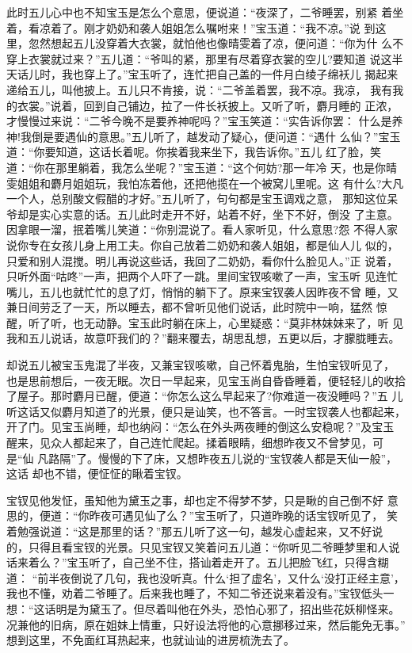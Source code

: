此时五儿心中也不知宝玉是怎么个意思，便说道：“夜深了，二爷睡罢，别紧
着坐着，看凉着了。刚才奶奶和袭人姐姐怎么嘱咐来！”宝玉道：“我不凉。”说
到这里，忽然想起五儿没穿着大衣裳，就怕他也像晴雯着了凉，便问道：“你为什
么不穿上衣裳就过来？”五儿道：“爷叫的紧，那里有尽着穿衣裳的空儿?要知道
说这半天话儿时，我也穿上了。”宝玉听了，连忙把自己盖的一件月白绫子绵袄儿
揭起来递给五儿，叫他披上。五儿只不肯接，说：“二爷盖着罢，我不凉。我凉，
我有我的衣裳。”说着，回到自己铺边，拉了一件长袄披上。又听了听，麝月睡的
正浓，才慢慢过来说：“二爷今晚不是要养神呢吗？”宝玉笑道：“实告诉你罢：
什么是养神!我倒是要遇仙的意思。”五儿听了，越发动了疑心，便问道：“遇什
么仙？”宝玉道：“你要知道，这话长着呢。你挨着我来坐下，我告诉你。”五儿
红了脸，笑道：“你在那里躺着，我怎么坐呢？”宝玉道：“这个何妨?那一年冷
天，也是你晴雯姐姐和麝月姐姐玩，我怕冻着他，还把他揽在一个被窝儿里呢。这
有什么?大凡一个人，总别酸文假醋的才好。”五儿听了，句句都是宝玉调戏之意，
那知这位呆爷却是实心实意的话。五儿此时走开不好，站着不好，坐下不好，倒没
了主意。因拿眼一溜，抿着嘴儿笑道：“你别混说了。看人家听见，什么意思?怨
不得人家说你专在女孩儿身上用工夫。你自己放着二奶奶和袭人姐姐，都是仙人儿
似的，只爱和别人混搅。明儿再说这些话，我回了二奶奶，看你什么脸见人。”正
说着，只听外面“咕咚”一声，把两个人吓了一跳。里间宝钗咳嗽了一声，宝玉听
见连忙嘴儿，五儿也就忙忙的息了灯，悄悄的躺下了。原来宝钗袭人因昨夜不曾
睡，又兼日间劳乏了一天，所以睡去，都不曾听见他们说话，此时院中一响，猛然
惊醒，听了听，也无动静。宝玉此时躺在床上，心里疑惑：“莫非林妹妹来了，听
见我和五儿说话，故意吓我们的？”翻来覆去，胡思乱想，五更以后，才朦胧睡去。

却说五儿被宝玉鬼混了半夜，又兼宝钗咳嗽，自己怀着鬼胎，生怕宝钗听见了，
也是思前想后，一夜无眠。次日一早起来，见宝玉尚自昏昏睡着，便轻轻儿的收拾
了屋子。那时麝月已醒，便道：“你怎么这么早起来了?你难道一夜没睡吗？”五
儿听这话又似麝月知道了的光景，便只是讪笑，也不答言。一时宝钗袭人也都起来，
开了门。见宝玉尚睡，却也纳闷：“怎么在外头两夜睡的倒这么安稳呢？”及宝玉
醒来，见众人都起来了，自己连忙爬起。揉着眼睛，细想昨夜又不曾梦见，可是“仙
凡路隔”了。慢慢的下了床，又想昨夜五儿说的“宝钗袭人都是天仙一般”，这话
却也不错，便怔怔的瞅着宝钗。

宝钗见他发怔，虽知他为黛玉之事，却也定不得梦不梦，只是瞅的自己倒不好
意思的，便道：“你昨夜可遇见仙了么？”宝玉听了，只道昨晚的话宝钗听见了，
笑着勉强说道：“这是那里的话？”那五儿听了这一句，越发心虚起来，又不好说
的，只得且看宝钗的光景。只见宝钗又笑着问五儿道：“你听见二爷睡梦里和人说
话来着么？”宝玉听了，自己坐不住，搭讪着走开了。五儿把脸飞红，只得含糊道：
“前半夜倒说了几句，我也没听真。什么‘担了虚名’，又什么‘没打正经主意’，
我也不懂，劝着二爷睡了。后来我也睡了，不知二爷还说来着没有。”宝钗低头一
想：“这话明是为黛玉了。但尽着叫他在外头，恐怕心邪了，招出些花妖柳怪来。
况兼他的旧病，原在姐妹上情重，只好设法将他的心意挪移过来，然后能免无事。”
想到这里，不免面红耳热起来，也就讪讪的进房梳洗去了。

